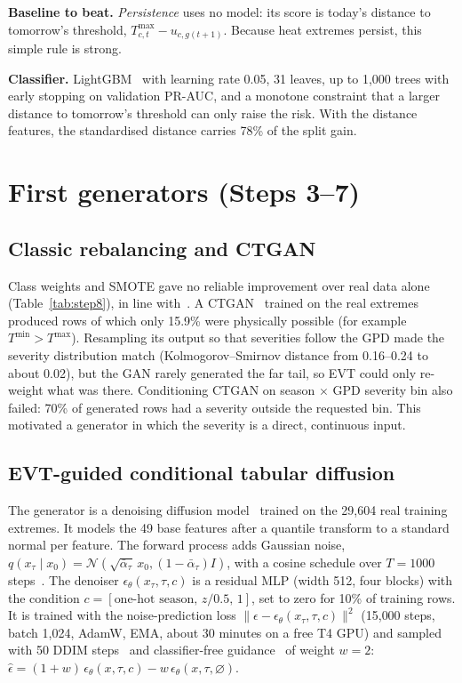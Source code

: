 \documentclass[11pt,a4paper]{article}
\begin{document}
\textbf{Baseline to beat.} \emph{Persistence} uses no model: its score is today's distance to tomorrow's
threshold, $T^{\max}_{c,t}-u_{c,g(t+1)}$. Because heat extremes persist, this simple rule is strong.

\textbf{Classifier.} LightGBM~\cite{ke2017lightgbm} with learning rate 0.05, 31 leaves, up to 1{,}000 trees
with early stopping on validation PR-AUC, and a monotone constraint that a larger distance to tomorrow's
threshold can only raise the risk. With the distance features, the standardised distance carries 78\% of
the split gain.

\section{First generators (Steps 3--7)}
\subsection{Classic rebalancing and CTGAN}
Class weights and SMOTE gave no reliable improvement over real data alone (Table~\ref{tab:step8}), in line
with~\cite{elor2022smote}. A CTGAN~\cite{xu2019ctgan} trained on the real extremes produced rows of which
only 15.9\% were physically possible (for example $T^{\min}>T^{\max}$). Resampling its output so that
severities follow the GPD made the severity distribution match (Kolmogorov--Smirnov distance from
0.16--0.24 to about 0.02), but the GAN rarely generated the far tail, so EVT could only re-weight what was
there. Conditioning CTGAN on season $\times$ GPD severity bin also failed: 70\% of generated rows had a
severity outside the requested bin. This motivated a generator in which the severity is a direct,
continuous input.

\subsection{EVT-guided conditional tabular diffusion}\label{sec:diff}
The generator is a denoising diffusion model~\cite{ho2020ddpm} trained on the 29{,}604 real training
extremes. It models the 49 base features after a quantile transform to a standard normal per feature. The
forward process adds Gaussian noise, $q(x_\tau\mid x_0)=\mathcal{N}(\sqrt{\bar\alpha_\tau}\,x_0,
(1-\bar\alpha_\tau)I)$, with a cosine schedule over $T=1000$ steps~\cite{nichol2021improved}. The denoiser
$\epsilon_\theta(x_\tau,\tau,c)$ is a residual MLP (width 512, four blocks) with the condition
$c=[\text{one-hot season},\, z/0.5,\, 1]$, set to zero for 10\% of training rows. It is trained with the
noise-prediction loss $\lVert\epsilon-\epsilon_\theta(x_\tau,\tau,c)\rVert^2$ (15{,}000 steps, batch 1{,}024,
AdamW, EMA, about 30 minutes on a free T4 GPU) and sampled with 50 DDIM steps~\cite{song2021ddim} and
classifier-free guidance~\cite{ho2022cfg} of weight $w=2$:
$\hat\epsilon=(1+w)\,\epsilon_\theta(x,\tau,c)-w\,\epsilon_\theta(x,\tau,\varnothing)$.
\end{document}
